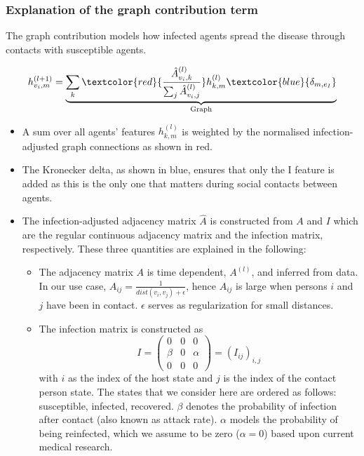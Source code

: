 \subsubsection{Explanation of the graph contribution term}
The graph contribution models how infected agents spread the disease through contacts with susceptible agents.

\begin{equation}
h_{v_i, m}^{(l+1)}
=
\underbrace{
	\sum_k \textcolor{red}{\frac{\hat{A}_{v_i, k}^{(l)}}{\sum_j \hat{A}_{v_i, j}^{(l)}}} h_{k, m}^{(l)} \textcolor{blue}{\delta_{m, e_I}}
}_{\text{Graph}}
\end{equation}

\begin{itemize}
	\item A sum over all agents' features $h_{k,m}^{(l)}$ is weighted by the normalised infection-adjusted graph connections as shown in red.
	\item The Kronecker delta, as shown in blue, ensures that only the I feature is added as this is the only one that matters during social contacts between agents.
	\item The infection-adjusted adjacency matrix $\hat{A}$ is constructed from $A$ and $I$ which are the regular continuous adjacency matrix and the infection matrix, respectively. These three quantities are explained in the following:
	\begin{itemize}
		\item The adjacency matrix $A$ is time dependent, $A^{(l)}$, and inferred from data. In our use case, $A_{ij} = \frac{1}{dist(v_i, v_j)+\epsilon}$, hence $A_{ij}$ is large when persons $i$ and $j$ have been in contact. $\epsilon$ serves as regularization for small distances.
		\item The infection matrix is constructed as
		\begin{equation}
		I =
		\begin{pmatrix}
		0     &  0  & 0 \\
		\beta &  0  & \alpha \\
		0     &  0  & 0
		\end{pmatrix}
		=
		(I_{ij})_{i,j}
		\end{equation}
		with $i$ as the index of the host state and $j$ is the index of the contact person state. The states that we consider here are ordered as follows: susceptible, infected, recovered. $\beta$ denotes the probability of infection  after contact (also known as attack rate). $\alpha$ models the probability of being reinfected, which we assume to be zero ($\alpha=0$) based upon current medical research.

\end{itemize}
\end{itemize}

